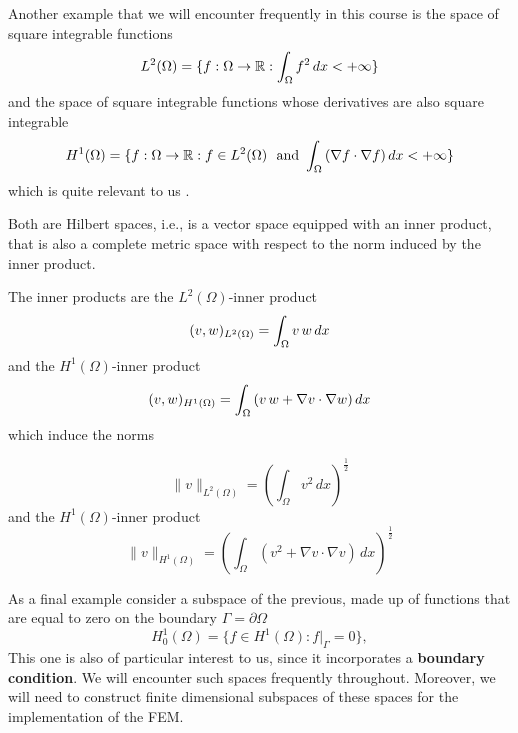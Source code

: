 Another example that we will encounter frequently in this course is the space of
square integrable functions
\begin{equation}
L^2(\Omega) = \{f: \Omega \rightarrow \mathbb{R} : \int_{\Omega} f^2\,dx < +\infty\} \labeq{L2sp}
\end{equation}
and the space of square integrable functions whose derivatives are also
square integrable
\begin{equation}
H^1(\Omega) = \{f: \Omega \rightarrow \mathbb{R} : f \in L^2(\Omega)~~\mbox{and}~ \int_{\Omega}{(\nabla{f}\cdot\nabla{f})} \,dx < +\infty\} \labeq{H1sp}
\end{equation}
which is quite relevant to us .

Both are Hilbert spaces, i.e.,
is a vector space equipped with an inner product, that
is also a complete metric space with respect to the norm induced by
the inner product.

The inner products are the $L^2(\Omega)$-inner product
\begin{equation}
(v,w)_{L^2(\Omega)} = \int_{\Omega}{v\,w}\,dx  \labeq{L2inner}
\end{equation}
and the $H^1(\Omega)$-inner product
\begin{equation}
(v,w)_{H^1(\Omega)} = \int_{\Omega}{\left (v\,w + \nabla{v} \cdot \nabla{w}\right )}\,dx \labeq{H1inner}
\end{equation}
which induce the norms

\begin{equation}
\|v\|_{L^2(\Omega)} = \left ( \int_{\Omega}{v^2}\,dx  \right )^{\frac12} \nonumber
\end{equation}
and the $H^1(\Omega)$-inner product
\begin{equation}
\|v\|_{H^1(\Omega)} = \left ( \int_{\Omega}{\left (v^2 + \nabla{v} \cdot \nabla{v}\right )}\,dx \right )^{\frac12}  \nonumber
\end{equation}

As a final example consider a subspace of the previous, made up of functions
that are equal to zero on the boundary $\Gamma = \partial{\Omega}$
\begin{equation}
H^1_0(\Omega) = \{f \in H^1(\Omega) : f|_{\Gamma} = 0 \}, \nonumber
\end{equation}
This one is also of particular interest to us, since it incorporates
a \textbf{boundary condition}. 
We will encounter such spaces frequently throughout. Moreover, 
we will need to construct finite dimensional subspaces of these spaces 
for the implementation of the FEM. 


